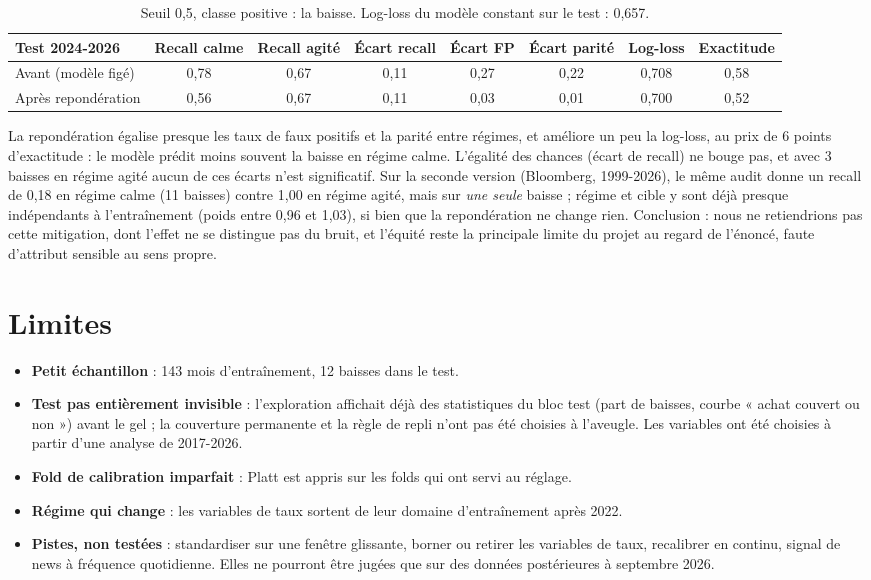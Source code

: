 \documentclass[11pt,a4paper]{article}
\begin{document}
\begin{table}[H]\centering\footnotesize\setlength\tabcolsep{4pt}
\begin{tabular}{lccccccc}\toprule
Test 2024-2026 & Recall calme & Recall agité & Écart recall & Écart FP & Écart parité & Log-loss & Exactitude \\\midrule
Avant (modèle figé) & 0,78 & 0,67 & 0,11 & 0,27 & 0,22 & 0,708 & 0,58 \\
Après repondération & 0,56 & 0,67 & 0,11 & 0,03 & 0,01 & 0,700 & 0,52 \\\bottomrule
\end{tabular}
\caption*{\small Seuil 0,5, classe positive : la baisse. Log-loss du modèle constant sur le test : 0,657.}\end{table}

La repondération égalise presque les taux de faux positifs et la parité entre régimes, et améliore un peu la log-loss,
au prix de 6 points d'exactitude : le modèle prédit moins souvent la baisse en régime calme. L'égalité des chances
(écart de recall) ne bouge pas, et avec 3 baisses en régime agité aucun de ces écarts n'est significatif. Sur la
seconde version (Bloomberg, 1999-2026), le même audit donne un recall de 0,18 en régime calme (11 baisses) contre
1,00 en régime agité, mais sur \emph{une seule} baisse ; régime et cible y sont déjà presque indépendants à
l'entraînement (poids entre 0,96 et 1,03), si bien que la repondération ne change rien. Conclusion : nous ne
retiendrions pas cette mitigation, dont l'effet ne se distingue pas du bruit, et l'équité reste la principale limite du
projet au regard de l'énoncé, faute d'attribut sensible au sens propre.



\section{Limites}

\begin{itemize}
\item \textbf{Petit échantillon} : 143 mois d'entraînement, 12 baisses dans le test.
\item \textbf{Test pas entièrement invisible} : l'exploration affichait déjà des statistiques du bloc test (part de baisses,
courbe « achat couvert ou non ») avant le gel ; la couverture permanente et la règle de repli n'ont pas été choisies à
l'aveugle. Les variables ont été choisies à partir d'une analyse de 2017-2026.
\item \textbf{Fold de calibration imparfait} : Platt est appris sur les folds qui ont servi au réglage.
\item \textbf{Régime qui change} : les variables de taux sortent de leur domaine d'entraînement après 2022.
\item \textbf{Pistes, non testées} : standardiser sur une fenêtre glissante, borner ou retirer les variables de taux,
recalibrer en continu, signal de news à fréquence quotidienne. Elles ne pourront être jugées que sur des données
postérieures à septembre 2026.
\end{itemize}
\end{document}
